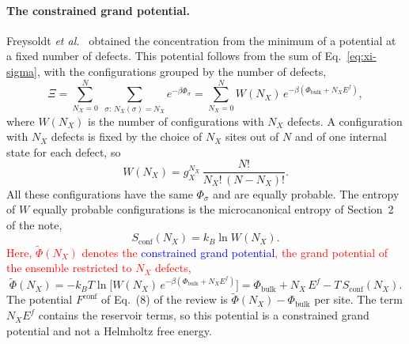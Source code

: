 \documentclass[11pt]{article}      %
\numberwithin{equation}{section}   %
\begin{document}
\paragraph{The constrained grand potential.}
Freysoldt \textit{et al.}~\cite{freysoldt} obtained the concentration from
the minimum of a potential at a fixed number of defects. This potential
follows from the sum of Eq.~\eqref{eq:xi-sigma}, with the configurations
grouped by the number of defects,
\begin{equation*}
    \Xi=\sum_{N_X=0}^{N}\;\sum_{\sigma:\,N_X(\sigma)=N_X}e^{-\beta\Phi_\sigma}
    =\sum_{N_X=0}^{N}W(N_X)\,e^{-\beta\left(\Phi_{\text{bulk}}+N_XE^f\right)},
\end{equation*}
where $W(N_X)$ is the number of configurations with $N_X$ defects. A
configuration with $N_X$ defects is fixed by the choice of $N_X$ sites out
of $N$ and of one internal state for each defect, so
\begin{equation}
    \boxed{W(N_X)=g_X^{N_X}\,\frac{N!}{N_X!\,(N-N_X)!}.}
\end{equation}
All these configurations have the same $\Phi_\sigma$ and are equally
probable. The entropy of $W$ equally probable configurations is the
microcanonical entropy of Section~2 of the note,
\begin{equation*}
    S_{\text{conf}}(N_X)=k_B\ln W(N_X).
\end{equation*}
\textcolor{red}{Here, $\widetilde{\Phi}(N_X)$ denotes the
\textcolor{blue}{constrained grand potential}, the grand potential of the
ensemble restricted to $N_X$ defects,}
\begin{equation}
    \boxed{\widetilde{\Phi}(N_X)
    =-k_BT\ln\Big[W(N_X)\,e^{-\beta\left(\Phi_{\text{bulk}}+N_XE^f\right)}\Big]
    =\Phi_{\text{bulk}}+N_X\,E^f-T\,S_{\text{conf}}(N_X).}
    \label{eq:constrained}
\end{equation}
The potential $F^{\text{conf}}$ of Eq.~(8) of the review is
$\widetilde{\Phi}(N_X)-\Phi_{\text{bulk}}$ per site. The term $N_XE^f$
contains the reservoir terms, so this potential is a constrained grand
potential and not a Helmholtz free energy.
\end{document}
